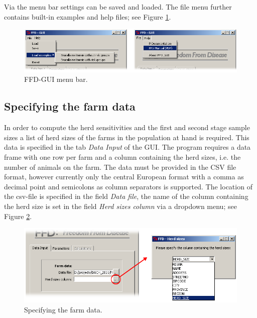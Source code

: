 \documentclass[nojss]{jss}
\begin{document}
Via the menu bar settings can be saved and loaded. The file menu further contains built-in examples and help files; see Figure \ref{fig:GUI_menu}.

\begin{figure}[h!t]
\begin{center}
\includegraphics[width=140mm]{GUI_menu.png}
\end{center}
\caption{FFD-GUI menu bar.}
\label{fig:GUI_menu}
\end{figure}

\subsection{Specifying the farm data}
\label{subsec:GUI_farm_data}

In order to compute the herd sensitivities and the first and second stage sample sizes a list of herd sizes of the farms in the population at hand is required. This data is specified in the tab \emph{Data Input}  of the GUI. The program requires a data frame with one row per farm and a column containing the herd sizes, i.e. the number of animals on the farm. The data must be provided in the CSV file format, however currently only the central European format with a comma as decimal point and semicolons as column separators is supported. The location of the csv-file is specified in the field  \emph{Data file}, the name of the column containing the herd size is set in the field  \emph{Herd sizes column} via a dropdown menu; see Figure \ref{fig:GUI_Herd_Size}.

\begin{figure}[h!t]
\begin{center}
\includegraphics[width=125mm]{GUI_Herd_Size2.png}
\end{center}
\caption{Specifying the farm data.}
\label{fig:GUI_Herd_Size} \end{figure}
\end{document}
